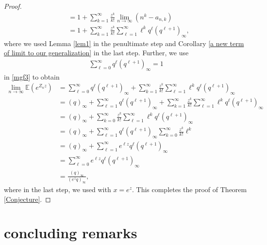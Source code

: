 \documentclass[11pt,reqno]{amsart}
\renewcommand{\(}{\left\(}
\renewcommand{\)}{\right\)}
\renewcommand{\[}{\left\[}
\renewcommand{\]}{\right\]}
\numberwithin{equation}{section}
\theoremstyle{plain}
\begin{document}
\begin{proof}
\begin{align}
&= 1 +  \sum_{k=1}^\infty \frac{z^k}{k!} \lim_{n\to\infty} (n^k-a_{n,k}) \nonumber \\
&= 1 +  \sum_{k=1}^\infty \frac{z^k}{k!} \sum_{\ell=1}^\infty \ell^kq^\ell(q^{\ell+1})_\infty,
\end{align}
where we used Lemma \ref{lem1} in the penultimate step and Corollary \ref{a new term of limit to our generalization} in the last step. %
Further, we use
\begin{align*}
\sum_{\ell=0}^\infty q^\ell(q^{\ell+1})_\infty =1
\end{align*}
in \eqref{mgf3} to obtain
{\allowdisplaybreaks
\begin{align*}
\lim_{n\to\infty} \mathbb{E}\left(e^{Z_n z}\right)&= \sum_{\ell=0}^\infty q^\ell(q^{\ell+1})_\infty +  \sum_{k=1}^\infty \frac{z^k}{k!} \sum_{\ell=1}^\infty \ell^kq^\ell(q^{\ell+1})_\infty \nonumber \\
 &=  (q)_\infty + \sum_{\ell=1}^\infty q^\ell(q^{\ell+1})_\infty +  \sum_{k=1}^\infty \frac{z^k}{k!} \sum_{\ell=1}^\infty \ell^kq^\ell(q^{\ell+1})_\infty \nonumber \\
&=  (q)_\infty +  \sum_{k=0}^\infty \frac{z^k}{k!} \sum_{\ell=1}^\infty \ell^kq^\ell(q^{\ell+1})_\infty \nonumber \\
&=  (q)_\infty + \sum_{\ell=1}^\infty q^\ell(q^{\ell+1})_\infty  \sum_{k=0}^\infty \frac{z^k}{k!} \ell^k \nonumber \\
&=(q)_\infty + \sum_{\ell=1}^\infty e^{\ell z} q^\ell(q^{\ell+1})_\infty \nonumber \\
&=\sum_{\ell=0}^\infty e^{\ell z} q^\ell(q^{\ell+1})_\infty \nonumber \\
&= \frac{(q)_\infty}{(e^z q)_\infty},
\end{align*}}
where in the last step, we used \cite[Equation 2.3]{uchimura87} with $x=e^z$. This completes the proof of Theorem \ref{Conjecture}.

\end{proof} 


\section{concluding remarks}\label{remarks}
\end{document}
